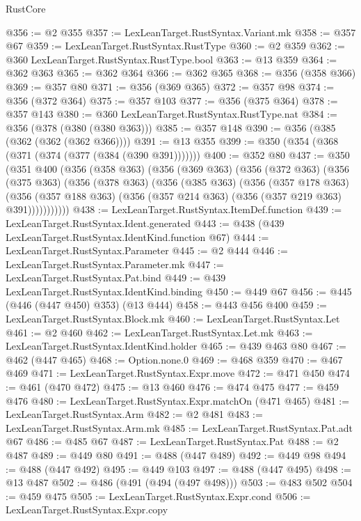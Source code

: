 \begin{lexlean}{RustCore}
\begin{coremodule}
@356 := @2 @355
@357 := LexLeanTarget.RustSyntax.Variant.mk
@358 := @357 @67
@359 := LexLeanTarget.RustSyntax.RustType
@360 := @2 @359
@362 := @360 LexLeanTarget.RustSyntax.RustType.bool
@363 := @13 @359
@364 := @362 @363
@365 := @362 @364
@366 := @362 @365
@368 := @356 (@358 @366)
@369 := @357 @80
@371 := @356 (@369 @365)
@372 := @357 @98
@374 := @356 (@372 @364)
@375 := @357 @103
@377 := @356 (@375 @364)
@378 := @357 @143
@380 := @360 LexLeanTarget.RustSyntax.RustType.nat
@384 := @356 (@378 (@380 (@380 @363)))
@385 := @357 @148
@390 := @356 (@385 (@362 (@362 (@362 @366))))
@391 := @13 @355
@399 := @350 (@354 (@368 (@371 (@374 (@377 (@384 (@390 @391)))))))
@400 := @352 @80
@437 := @350
    (@351
      @400
      (@356
        (@358 @363)
        (@356
          (@369 @363)
          (@356
            (@372 @363)
            (@356
              (@375 @363)
              (@356
                (@378 @363)
                (@356
                  (@385 @363)
                  (@356
                    (@357 @178 @363)
                    (@356
                      (@357 @188 @363)
                      (@356 (@357 @214 @363) (@356 (@357 @219 @363) @391)))))))))))
@438 := LexLeanTarget.RustSyntax.ItemDef.function
@439 := LexLeanTarget.RustSyntax.Ident.generated
@443 := @438 (@439 LexLeanTarget.RustSyntax.IdentKind.function @67)
@444 := LexLeanTarget.RustSyntax.Parameter
@445 := @2 @444
@446 := LexLeanTarget.RustSyntax.Parameter.mk
@447 := LexLeanTarget.RustSyntax.Pat.bind
@449 := @439 LexLeanTarget.RustSyntax.IdentKind.binding
@450 := @449 @67
@456 := @445 (@446 (@447 @450) @353) (@13 @444)
@458 := @443 @456 @400
@459 := LexLeanTarget.RustSyntax.Block.mk
@460 := LexLeanTarget.RustSyntax.Let
@461 := @2 @460
@462 := LexLeanTarget.RustSyntax.Let.mk
@463 := LexLeanTarget.RustSyntax.IdentKind.holder
@465 := @439 @463 @80
@467 := @462 (@447 @465)
@468 := Option.none.{0}
@469 := @468 @359
@470 := @467 @469
@471 := LexLeanTarget.RustSyntax.Expr.move
@472 := @471 @450
@474 := @461 (@470 @472)
@475 := @13 @460
@476 := @474 @475
@477 := @459 @476
@480 := LexLeanTarget.RustSyntax.Expr.matchOn (@471 @465)
@481 := LexLeanTarget.RustSyntax.Arm
@482 := @2 @481
@483 := LexLeanTarget.RustSyntax.Arm.mk
@485 := LexLeanTarget.RustSyntax.Pat.adt @67
@486 := @485 @67
@487 := LexLeanTarget.RustSyntax.Pat
@488 := @2 @487
@489 := @449 @80
@491 := @488 (@447 @489)
@492 := @449 @98
@494 := @488 (@447 @492)
@495 := @449 @103
@497 := @488 (@447 @495)
@498 := @13 @487
@502 := @486 (@491 (@494 (@497 @498)))
@503 := @483 @502
@504 := @459 @475
@505 := LexLeanTarget.RustSyntax.Expr.cond
@506 := LexLeanTarget.RustSyntax.Expr.copy

\end{coremodule}
\end{lexlean}
